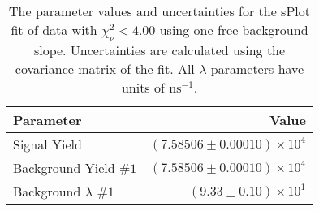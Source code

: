 
\begin{table}[ht]
    \begin{center}
        \begin{tabular}{lr}\toprule
            Parameter & Value \\\midrule
            Signal Yield & $(7.58506 \pm 0.00010) \times 10^{4}$ \\
            Background Yield $\#1$ & $(7.58506 \pm 0.00010) \times 10^{4}$ \\
            Background $\lambda$ $\#1$ & $(9.33 \pm 0.10) \times 10^{1}$ \\\bottomrule
        \end{tabular}
        \caption{The parameter values and uncertainties for the sPlot fit of data with $\chi^2_\nu < 4.00$ using one free background slope. Uncertainties are calculated using the covariance matrix of the fit. All $\lambda$ parameters have units of $\si{\nano\second}^{-1}$.}\label{tab:splot-fit-results-chisqdof-4.00-free-1}
    \end{center}
\end{table}
